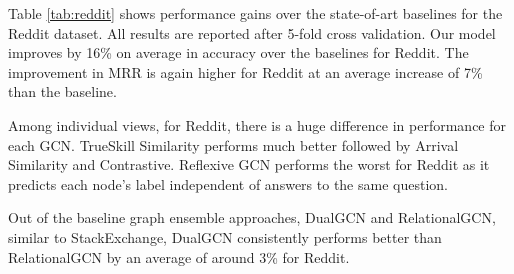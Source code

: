 \documentclass[smallcondensed]{svjour3}     %
\begin{document}
Table \ref{tab:reddit} shows performance gains over the state-of-art baselines for the Reddit dataset. All results are reported after 5-fold cross validation. Our model improves by 16\% on average in accuracy over the baselines for Reddit. The improvement in MRR is again higher for Reddit at an average increase of 7\% than the baseline.

Among individual views, for Reddit, there is a huge difference in performance for each GCN. TrueSkill Similarity performs much better followed by Arrival Similarity and Contrastive. Reflexive GCN performs the worst for Reddit as it predicts each node's label independent of answers to the same question.

Out of the baseline graph ensemble approaches, DualGCN and RelationalGCN, similar to StackExchange, DualGCN consistently performs better than RelationalGCN by an average of around 3\% for Reddit.

\small


\end{document}
